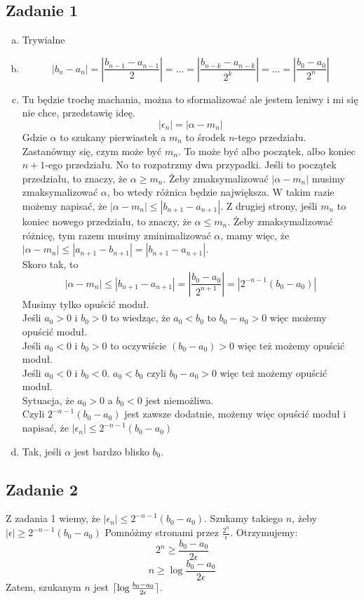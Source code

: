 \documentclass[a4paper]{article}
\DeclarePairedDelimiter\ceil{\lceil}{\rceil}
\begin{document}
\subsection*{Zadanie 1}
\begin{enumerate}[a)]
\item Trywialne
\item $$|b_n-a_n|=|\frac{b_{n-1}-a_{n-1}}{2}|=\ldots=|\frac{b_{n-k}-a_{n-k}}{2^{k}}|=\ldots=|\frac{b_{0}-a_{0}}{2^{n}}| $$
\item Tu będzie trochę machania, można to sformalizować ale jestem leniwy i mi się nie chce, przedstawię ideę.
$$|\epsilon_n|=|\alpha - m_n|$$
Gdzie $\alpha$ to szukany pierwiastek a $m_n$ to środek $n$-tego przedziału. Zastanówmy się, czym może być $m_n$. To może być albo początek, albo koniec $n+1$-ego przedziału. No to rozpatrzmy dwa przypadki. Jeśli to początek przedziału, to znaczy, że $\alpha \geq m_n$. Żeby zmaksymalizować $|\alpha - m_n|$ musimy zmaksymalizować $\alpha$, bo wtedy różnica będzie największa. W takim razie możemy napisać, że $|\alpha - m_n| \leq |b_{n+1}-a_{n+1}|$. Z drugiej strony, jeśli $m_n$ to koniec nowego przedziału, to znaczy, że $\alpha \leq m_n$. Żeby zmaksymalizować różnicę, tym razem musimy zminimalizować $\alpha$, mamy więc, że $|\alpha - m_n| \leq |a_{n+1}-b_{n+1}|=|b_{n+1}-a_{n+1}|$.\\
Skoro tak, to $$|\alpha - m_n| \leq |b_{n+1}-a_{n+1}| = |\frac{b_{0}-a_{0}}{2^{n+1}}|=|2^{-n-1}(b_0-a_0)|$$
Musimy tylko opuścić moduł.\\
Jeśli $a_0>0$ i $b_0>0$ to wiedząc, że $a_0<b_0$ to $b_0-a_0>0$ więc możemy opuścić moduł.\\
Jeśli $a_0<0$ i $b_0>0$ to oczywiście $(b_0-a_0)>0$ więc też możemy opuścić moduł.\\
Jeśli $a_0<0$ i $b_0<0$. $a_0<b_0$ czyli $b_0-a_0>0$ więc też możemy opuścić moduł.\\
Sytuacja, że $a_0>0$ a $b_0<0$ jest niemożliwa.\\
Czyli $2^{-n-1}(b_0-a_0)$ jest zawsze dodatnie, możemy więc opuścić moduł i napisać, że $|\epsilon_n|\leq 2^{-n-1}(b_0-a_0)$
\item Tak, jeśli $\alpha$ jest bardzo blisko $b_0$.
\end{enumerate}

\subsection*{Zadanie 2}
Z zadania 1 wiemy, że $|\epsilon_n|\leq 2^{-n-1}(b_0-a_0)$. Szukamy takiego $n$, żeby $|\epsilon|\geq 2^{-n-1}(b_0-a_0)$
Pomnóżmy stronami przez $\frac{2^{n}}{\epsilon}$. Otrzymujemy:
$$2^{n}\geq \frac{b_0-a_0}{2\epsilon}$$
$$n\geq \log{\frac{b_0-a_0}{2\epsilon}} $$
Zatem, szukanym $n$ jest $\ceil{\log{\frac{b_0-a_0}{2\epsilon}}}$.
\end{document}
